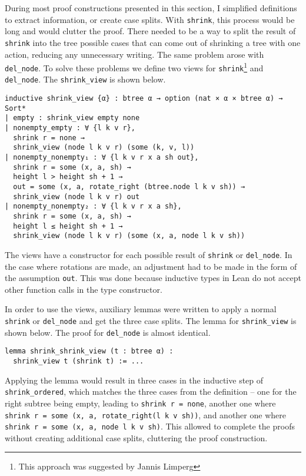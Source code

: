 During most proof constructions presented in this section, I simplified definitions to extract information, or create case splits. With \lstinline{shrink}, this process would be long and would clutter the proof. There needed to be a way to split the result of \lstinline{shrink} into the tree possible cases that can come out of shrinking a tree with one action, reducing any unnecessary writing. The same problem arose with \lstinline{del_node}. To solve these problems we define two views for \lstinline{shrink}\footnote{This approach was suggested by Jannis Limperg} and \lstinline{del_node}. The \lstinline{shrink_view} is shown below.

\begin{lstlisting}
inductive shrink_view {α} : btree α → option (nat × α × btree α) → Sort*
| empty : shrink_view empty none
| nonempty_empty : ∀ {l k v r},
  shrink r = none →
  shrink_view (node l k v r) (some (k, v, l))
| nonempty_nonempty₁ : ∀ {l k v r x a sh out},
  shrink r = some (x, a, sh) →
  height l > height sh + 1 →
  out = some (x, a, rotate_right (btree.node l k v sh)) →
  shrink_view (node l k v r) out
| nonempty_nonempty₂ : ∀ {l k v r x a sh},
  shrink r = some (x, a, sh) →
  height l ≤ height sh + 1 →
  shrink_view (node l k v r) (some (x, a, node l k v sh))
\end{lstlisting}

The views have a constructor for each possible result of \lstinline{shrink} or \lstinline{del_node}. In the case where rotations are made, an adjustment had to be made in the form of the assumption \lstinline{out}. This was done because inductive types in Lean do not accept other function calls in the type constructor.

In order to use the views, auxiliary lemmas were written to apply a normal \lstinline{shrink} or \lstinline{del_node} and get the three case splits. The lemma for \lstinline{shrink_view} is shown below. The proof for \lstinline{del_node} is almost identical.

\begin{lstlisting}
lemma shrink_shrink_view (t : btree α) : 
  shrink_view t (shrink t) := ...
\end{lstlisting}

Applying the lemma would result in three cases in the inductive step of \lstinline{shrink_ordered}, which matches the three cases from the definition -- one for the right subtree being empty, leading to \lstinline{shrink r = none}, another one where \lstinline{shrink r = some (x, a, rotate_right(l k v sh))}, and another one where \lstinline{shrink r = some (x, a, node l k v sh)}. This allowed to complete the proofs without creating additional case splits, cluttering the proof construction.